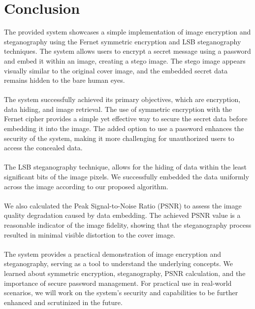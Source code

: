 \documentclass{report}
\begin{document}
\newpage
{}
\chapter{Conclusion}
The provided system showcases a simple implementation of image encryption and steganography using the Fernet symmetric encryption and LSB steganography techniques. The system allows users to encrypt a secret message using a password and embed it within an image, creating a stego image. The stego image appears visually similar to the original cover image, and the embedded secret data remains hidden to the bare human eyes.\\\\
The system successfully achieved its primary objectives, which are encryption, data hiding, and image retrieval. The use of symmetric encryption with the Fernet cipher provides a simple yet effective way to secure the secret data before embedding it into the image. The added option to use a password enhances the security of the system, making it more challenging for unauthorized users to access the concealed data.\\\\
The LSB steganography technique, allows for the hiding of data within the least significant bits of the image pixels. We successfully embedded the data uniformly across the image according to our proposed algorithm. \\\\
We also calculated the Peak Signal-to-Noise Ratio (PSNR) to assess the image quality degradation caused by data embedding. The achieved PSNR value is a reasonable indicator of the image fidelity, showing that the steganography process resulted in minimal visible distortion to the cover image.\\\\
The system provides a practical demonstration of  image encryption and steganography, serving as a tool to understand the underlying concepts. We learned about symmetric encryption, steganography, PSNR calculation, and the importance of secure password management. For practical use in real-world scenarios, we will work on the system's security and capabilities to be further enhanced and scrutinized in the future.



\section*{}
\end{document}
